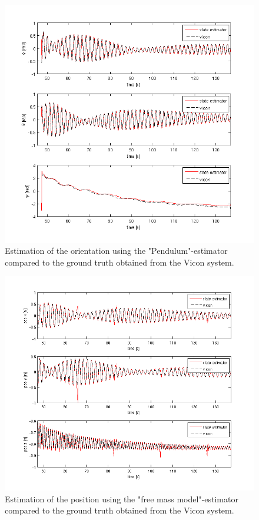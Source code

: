\begin{figure}[h]
\centering
\includegraphics[width=1\textwidth]{pictures/2_2_SNR5_orientation_GPS.png}
\caption{Estimation of the orientation using the "Pendulum"-estimator compared to the ground truth obtained from the Vicon system.}
\label{orientation}
\end{figure}
\begin{figure}[h]
\centering
\includegraphics[width=1\textwidth]{pictures/2_2_fmm_SNR5_pos_GPS.png}
\caption{Estimation of the position using the "free mass model"-estimator compared to the ground truth obtained from the Vicon system.}
\label{pos_fmm}
\end{figure}
